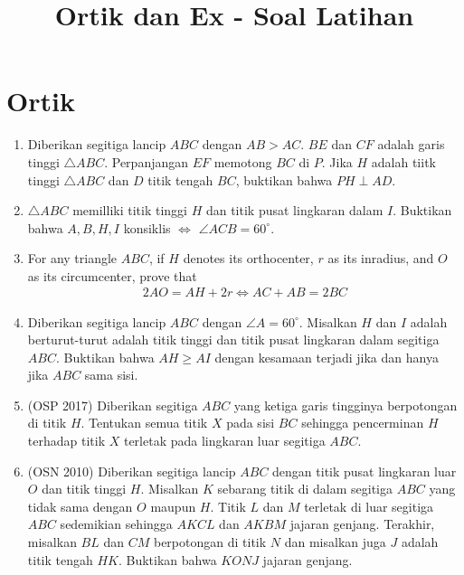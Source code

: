 \documentclass[12pt]{scrartcl}
\title{Ortik dan Ex - Soal Latihan}
\begin{document}
\maketitle

\renewcommand*\contentsname{Daftar Isi}
\tableofcontents

\newpage
\section{Ortik}
\begin{enumerate}
\item Diberikan segitiga lancip $ABC$ dengan $AB>AC$. $BE$ dan $CF$ adalah garis tinggi $\triangle ABC$. Perpanjangan $EF$ memotong $BC$ di $P$. Jika $H$ adalah tiitk tinggi $\triangle ABC$ dan $D$ titik tengah $BC$, buktikan bahwa $PH \perp AD$.

\item $\triangle ABC$ memilliki titik tinggi $H$ dan titik pusat lingkaran dalam $I$. Buktikan bahwa $A,B,H,I$ konsiklis $\iff$ $\angle ACB = 60^\circ$.

\item For any triangle $ABC$, if $H$ denotes its orthocenter, $r$ as its inradius, and $O$ as its circumcenter, prove that 
 \begin{align*}
     2AO = AH + 2r \iff AC+AB=2BC
 \end{align*}

\item Diberikan segitiga lancip $ABC$ dengan $\angle A = 60^\circ$. Misalkan $H$ dan $I$ adalah berturut-turut adalah titik tinggi dan titik pusat lingkaran dalam segitiga $ABC$. Buktikan bahwa $AH \ge AI$ dengan kesamaan terjadi jika dan hanya jika $ABC$ sama sisi.

\item (OSP 2017) Diberikan segitiga $ABC$ yang ketiga garis tingginya berpotongan di titik $H$. Tentukan semua titik $X$ pada sisi $BC$ sehingga pencerminan $H$ terhadap titik $X$ terletak pada lingkaran luar segitiga $ABC$.

\item (OSN 2010) Diberikan segitiga lancip $ABC$ dengan titik pusat lingkaran luar $O$ dan titik tinggi $H$. Misalkan $K$ sebarang titik di dalam segitiga $ABC$ yang tidak sama dengan $O$ maupun $H$. Titik $L$ dan $M$ terletak di luar segitiga $ABC$ sedemikian sehingga $AKCL$ dan $AKBM$ jajaran genjang. Terakhir, misalkan $BL$ dan $CM$ berpotongan di titik $N$ dan misalkan juga $J$ adalah titik tengah $HK$. Buktikan bahwa $KONJ$ jajaran genjang.


\end{enumerate}
\end{document}
